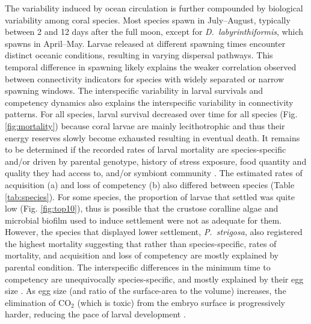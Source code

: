 \documentclass[preprint,12pt,authoryear]{elsarticle}
\begin{document}
	The variability induced by ocean circulation is further compounded by biological variability among coral species. Most species spawn in July–August, typically between 2 and 12 days after the full moon, except for \textit{D.~labyrinthiformis}, which spawns in April–May. Larvae released at different spawning times encounter distinct oceanic conditions, resulting in varying dispersal pathways. This temporal difference in spawning likely explains the weaker correlation observed between connectivity indicators for species with widely separated or narrow spawning windows. The interspecific variability in larval survivals and competency dynamics also explains the interspecific variability in connectivity patterns. For all species, larval survival decreased over time for all species (Fig. \ref{fig:mortality}) because coral larvae are mainly lecithotrophic and thus their energy reserves slowly become exhausted resulting in eventual death. It remains to be determined if the recorded rates of larval mortality are species-specific and/or driven by parental genotype, history of stress exposure, food quantity and quality they had access to, and/or symbiont community \citep{jones2011tradeoffs, baums2013genotypic, padilla2013all, kirk2018genomic}. The estimated rates of acquisition (a) and loss of competency (b) also differed between species (Table \ref{tab:species}). For some species, the proportion of larvae that settled was quite low (Fig. \ref{fig:top10}), thus is possible that the crustose coralline algae and microbial biofilm used to induce settlement were not as adequate for them. However, the species that displayed lower settlement, \textit{P.~strigosa}, also registered the highest mortality suggesting that rather than species-specific, rates of mortality, and acquisition and loss of competency are mostly explained by parental condition. The interspecific differences in the minimum time to competency are unequivocally species-specific, and mostly explained by their egg size \citep{figueiredo2013synthesizing}. As egg size (and ratio of the surface-area to the volume) increases, the elimination of CO$_2$ (which is toxic) from the embryo surface is progressively harder, reducing the pace of larval development \citep{berrill1935cell, einum2002egg}.
	
\end{document}
